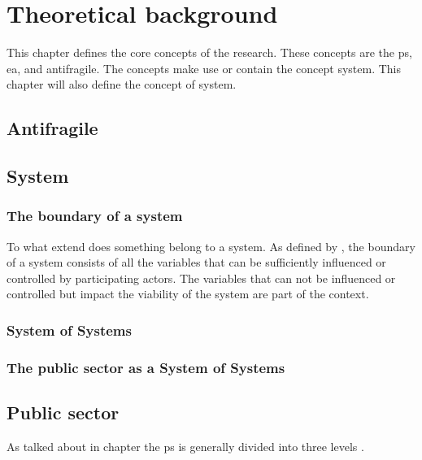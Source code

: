 \chapter{Theoretical background}
\label{ch:theoreticalbackground}
This chapter defines the core concepts of the research. These concepts are the \gls{ps}, \acrlong{ea}, and \gls{antifragile}. The concepts make use or contain the concept system. This chapter will also define the concept of system.

\section{Antifragile}
\label{sec:tbantifragile}



\section{System}
\label{sec:tbsystem}

\subsection{The boundary of a system}
To what extend does something belong to a system. As defined by \textcite[p. 182-183]{Gharajedaghi2011}, the boundary of a system consists of all the variables that can be sufficiently influenced or controlled by participating actors. The variables that can not be influenced or controlled but impact the viability of the system are part of the context.

\subsection{System of Systems}





\subsection{The public sector as a System of Systems}
\label{sub:tbpssystemofsystems}

\section{Public sector}
\label{sec:tbpublicsector}

As talked about in chapter  the \gls{ps} is generally divided into three levels \parencite{PrivacySense2016}.

